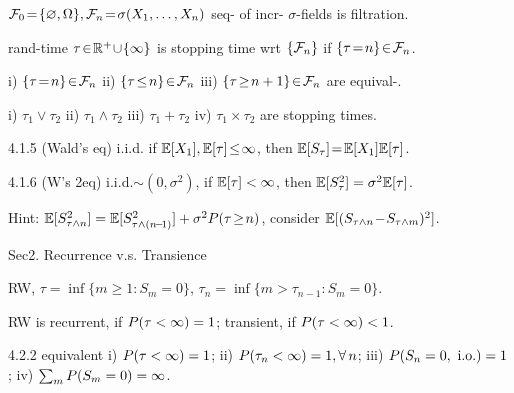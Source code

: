 \begin{defi} 
    $\mathcal{F}_0 \!=\! \{\varnothing, \Omega\}, \mathcal{F}_n \!=\! \sigma(X_1, \dots, X_n)$ seq- of incr- $\sigma$-fields is filtration.
\end{defi}

\begin{defi}
    rand-time $\tau \!\in\! \mathbb{R}^+ \!\cup\! \{\infty\}$ is stopping time wrt $\{\mathcal{F}_n\}$ if $\{\tau \!=\! n\}\!\in\! \mathcal{F}_n$.
\end{defi}

\begin{fact}
    i) $\{\tau \!=\! n\} \!\in\! \mathcal{F}_n$ ii) $\{\tau \!\leq\! n\} \!\in\! \mathcal{F}_n$ iii) $\{\tau \!\geq\! n+1\} \!\in\! \mathcal{F}_n$ are equival-.
\end{fact}

\begin{fact}
    i) $\tau_1 \vee \tau_2$ ii) $\tau_1 \wedge \tau_2$ iii) $\tau_1 + \tau_2$ iv) $\tau_1 \times \tau_2$ are stopping times.
\end{fact}

\begin{thm}{4.1.5} (Wald's eq)
    i.i.d. if $\mathbb{E}[X_1], \mathbb{E}[\tau] \!\leq\! \infty$, then $\mathbb{E}[S_\tau] \!=\! \mathbb{E}[X_1] \mathbb{E}[\tau]$.
\end{thm}

\begin{thm}{4.1.6} (W's 2eq)
    i.i.d.$\sim\! (0, \sigma^2)$, if $\mathbb{E}[\tau] < \infty$, then $\mathbb{E}[S^2_\tau] = \sigma^2\mathbb{E}[\tau]$.
    
    Hint: $\mathbb{E}[S^2_{\tau \wedge n}] = \mathbb{E}[S^2_{\tau \wedge (n \!-\! 1)}] + \sigma^2 P ( \tau \!\geq\! n )$, consider $\mathbb{E}[(S_{\tau \wedge n} \!-\! S_{\tau \wedge m})^2]$.
\end{thm}


Sec2. Recurrence v.s. Transience \hrulefill

\begin{defi}
    RW, $\tau = \inf\{m \geq 1: S_m = 0\}$, $\tau_n = \inf\{m > \tau_{n-1}: S_m = 0\}$.
    
    RW is recurrent, if $P ( \tau < \infty ) = 1$; transient, if $P ( \tau < \infty ) < 1$.
\end{defi}

\begin{thm}{4.2.2}
    equivalent i) $P ( \tau < \infty ) = 1$; ii) $P ( \tau_n < \infty ) = 1, \forall\, n$; 
    \newline iii) $P ( S_n = 0, \text{ i.o.} ) = 1$; iv) $\sum_m P ( S_m = 0 ) = \infty$.
\end{thm}

